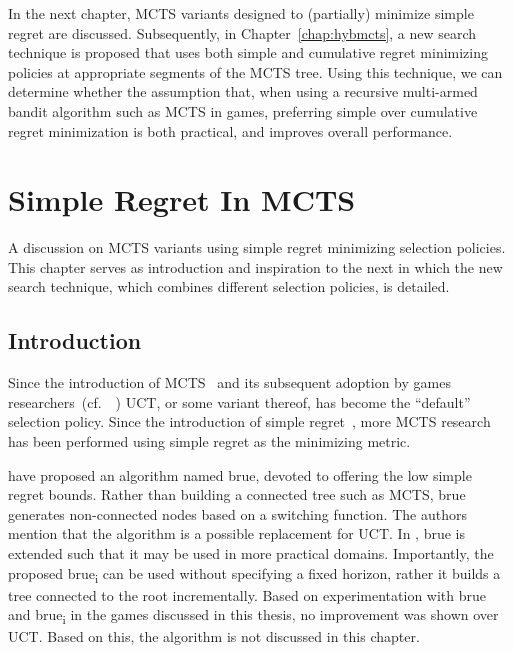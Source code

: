 \documentclass{kecsmstr}
\newcommand{\cf}{{cf.}~}
\begin{document}
In the next chapter, MCTS variants designed to (partially) minimize simple regret are discussed. Subsequently, in Chapter~\ref{chap:hybmcts}, a new search technique is proposed that uses both simple and cumulative regret minimizing policies at appropriate segments of the MCTS tree. Using this technique, we can determine whether the assumption that, when using a recursive multi-armed bandit algorithm such as MCTS in games, preferring simple over cumulative regret minimization is both practical, and improves overall performance.

\chapter{Simple Regret In MCTS}
\label{chap:mctssr}

\begin{chaptercontents} A discussion on MCTS variants using simple regret minimizing selection policies. This chapter serves as introduction and inspiration to the next in which the new search technique, which combines different selection policies, is detailed.
\end{chaptercontents}

\section{Introduction}
Since the introduction of MCTS~ and its subsequent adoption by games researchers~(\cf~) UCT, or some variant thereof, has become the ``default'' selection policy. Since the introduction of simple regret~, more MCTS research has been performed using simple regret as the minimizing metric.

 have proposed an algorithm named {\sc brue}, devoted to offering the low simple regret bounds. Rather than building a connected tree such as MCTS, {\sc brue} generates non-connected nodes based on a switching function. The authors mention that the algorithm is a possible replacement for UCT. In , {\sc brue} is extended such that it may be used in more practical domains. Importantly, the proposed {\sc brue\textsubscript{i}} can be used without specifying a fixed horizon, rather it builds a tree connected to the root incrementally. Based on experimentation with {\sc brue} and {\sc brue\textsubscript{i}} in the games discussed in this thesis, no improvement was shown over UCT. Based on this, the algorithm is not discussed in this chapter.
\end{document}
